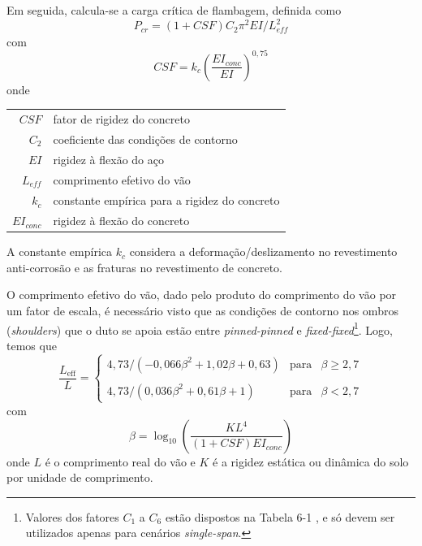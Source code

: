 Em seguida, calcula-se a carga crítica de flambagem, definida como
\begin{equation}
\label{eq:viv-Pcr}
P_\mathit{cr} = (1 + \mathit{CSF}) C_2\pi^2 \mathit{EI}/L_\mathit{eff}^2
\end{equation}
com
\begin{equation}
\label{eq:viv-CSF}
\mathit{CSF} = k_c  \left(\frac{\mathit{EI}_\mathit{conc}}{\mathit{EI}}\right)^{0,75}
\end{equation}
onde

\begin{tabular}{rl}
	$\mathit{CSF}$               & fator de rigidez do concreto\\
	$C_2$                        & coeficiente das condições de contorno\\
	$\mathit{EI}$                & rigidez à flexão do aço\\
	$L_\mathit{eff}$             & comprimento efetivo do vão\\
	$k_c$                        & constante empírica para a rigidez do concreto\\
	$\mathit{EI}_\mathit{conc}$  & rigidez à flexão do concreto
\end{tabular}

A constante empírica $k_c$ considera a deformação/deslizamento no revestimento anti-corrosão e as fraturas no revestimento de concreto.

O comprimento efetivo do vão, dado pelo produto do comprimento do vão por um fator de escala, é necessário visto que as condições de contorno nos ombros (\textit{shoulders}) que o duto se apoia estão entre \textit{pinned-pinned} e \textit{fixed-fixed}\footnote{Valores dos fatores $C_1$ a $C_6$ estão dispostos na Tabela 6-1 \cite[p. 111]{DNV2017}, e só devem ser utilizados apenas para cenários \textit{single-span}.}.
Logo, temos que
\begin{equation}
\label{eq:viv-LeffL}
\frac{L_\mathrm{eff}}{L} =
\left\{
\begin{matrix}
	4,73 / (-0,066 \beta^2 + 1,02 \beta + 0,63)   & \mathrm{para} & \beta \geq 2,7 \\
	\\
	4,73 / (0,036 \beta^2 + 0,61 \beta + 1)       & \mathrm{para} & \beta <    2,7
\end{matrix}
\right.
\end{equation}
com
\begin{equation}
\label{eq:viv-beta}
\beta = \log_{10}\left( \frac{K L^4}{(1 + \mathit{CSF})\mathit{EI}_\mathit{conc}} \right)
\end{equation}
onde $L$ é o comprimento real do vão e $K$ é a rigidez estática ou dinâmica do solo por unidade de comprimento.

